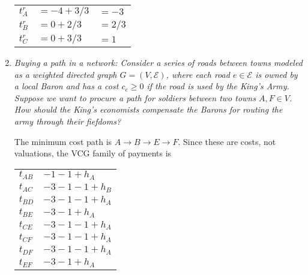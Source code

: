 \documentclass[letter, 10pt]{article}
\theoremstyle{definition}
\begin{document}
\begin{spacing}{1.1}
\begin{enumerate}
  \begin{tabular}{lll}
    $t_A^r$ & $= -4 + 3/3$ & $= -3$ \\
    $t_B^r$ & $= 0 + 2/3$ & $= 2/3$ \\
    $t_C^r$ & $= 0 + 3/3$ & $= 1$
  \end{tabular}

\item \textit{Buying a path in a network: Consider a series of roads
    between towns modeled as a weighted directed graph
    $G=(V,\mathcal{E})$, where each road $e\in \mathcal{E}$ is owned by a
    local Baron and has a cost $c_e \geq 0$ if the road is used by the
    King's Army. Suppose we want to procure a path for soldiers between
    two towns $A,F \in V$. How should the King's economists compensate the
    Barons for routing the army through their fiefdoms?}
    \begin{center}
    \end{center}

    The minimum cost path is $A\to B \to E \to F$. Since these are costs,
    not valuations, the VCG family of payments is
    
    \begin{tabular}{ll}
    $t_{AB}$ & $-1 -1 + h_A$ \\
    $t_{AC}$ & $-3-1-1 + h_B$ \\
    $t_{BD}$ & $-3-1-1 + h_A$ \\
    $t_{BE}$ & $-3-1 + h_A$ \\
    $t_{CE}$ & $-3-1-1 + h_A$ \\
    $t_{CF}$ & $-3-1-1 + h_A$ \\
    $t_{DF}$ & $-3-1-1 + h_A$ \\
    $t_{EF}$ & $-3-1 + h_A$
    \end{tabular}


\end{enumerate}
\end{spacing}
\end{document}
